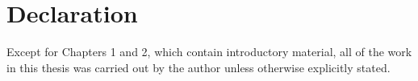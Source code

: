 \chapter{Declaration}

Except for Chapters 1 and 2, which contain introductory material, all of the work in this thesis was carried out by the author unless otherwise explicitly stated.
